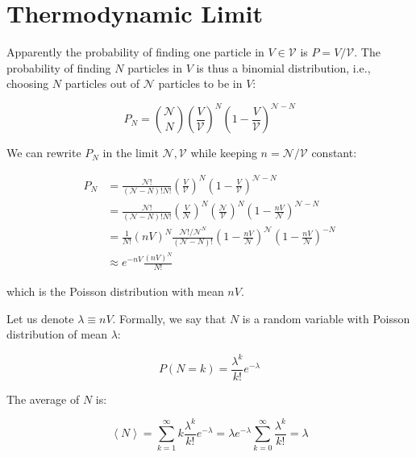 \documentclass[12pt]{article}
\begin{document}
\section*{Thermodynamic Limit}


Apparently the probability of finding one particle in $V \in \mathcal{V}$ is $P = V/\mathcal{V}$. The probability of finding $N$ particles in $V$ is thus a binomial distribution, i.e., choosing $N$ particles out of $\mathcal{N}$ particles to be in $V$:

\begin{equation}
    P_{N} = \binom{\mathcal{N}}{N} \left( \frac{V}{\mathcal{V}} \right)^{N} \left( 1 - \frac{V}{\mathcal{V}} \right)^{\mathcal{N} - N}
\end{equation}

We can rewrite $P_{N}$ in the limit $\mathcal{N}, \mathcal{V}$ while keeping $n = \mathcal{N}/\mathcal{V}$ constant:

\begin{equation}
    \begin{split}
        P_{N} &= \frac{\mathcal{N}!}{(\mathcal{N} - N)! N!} \left( \frac{V}{\mathcal{V}} \right)^{N} \left( 1 - \frac{V}{\mathcal{V}} \right)^{\mathcal{N} - N} \\
        &= \frac{\mathcal{N}!}{(\mathcal{N} - N)! N!} \left( \frac{V}{\mathcal{N}} \right)^{N} \left( \frac{\mathcal{N}}{\mathcal{V}} \right)^{N} \left( 1 - \frac{nV}{\mathcal{N}} \right)^{\mathcal{N} - N} \\
        &= \frac{1}{N!} (nV)^{N} \frac{\mathcal{N}!/\mathcal{N}^{N}}{(\mathcal{N} - N)!} \left( 1 - \frac{nV}{\mathcal{N}} \right)^{\mathcal{N}} \left( 1 - \frac{nV}{\mathcal{N}} \right)^{-N} \\
        &\approx e^{-nV} \frac{(nV)^{N}}{N!}
    \end{split}
\end{equation}

which is the Poisson distribution with mean $nV$.

Let us denote $\lambda \equiv nV$. Formally, we say that $N$ is a random variable with Poisson distribution of mean $\lambda$:

\begin{equation}
    P(N = k) = \frac{\lambda^{k}}{k!} e^{-\lambda}
\end{equation}

The average of $N$ is:

\begin{equation}
    \left\langle N \right\rangle = \sum_{k=1}^{\infty} k \frac{\lambda^{k}}{k!} e^{-\lambda} = \lambda e^{-\lambda} \sum_{k=0}^{\infty} \frac{\lambda^{k}}{k!} = \lambda
\end{equation}
\end{document}
